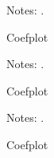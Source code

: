 \documentclass [11pt]{article}
\theoremstyle{plain}
\theoremstyle{definition}
\theoremstyle{remark}
\newcommand{\1}{\bm{1}}
\begin{document}
\begin{figure}[htbp]\centering
\caption{Coefplot}\label{Result1}
{\footnotesize  \begin{flushleft} Notes: .\end{flushleft}}
\end{figure}


\begin{figure}[htbp]\centering
\caption{Coefplot}\label{Result1}
{\footnotesize  \begin{flushleft} Notes: .\end{flushleft}}
\end{figure}

\begin{figure}[htbp]\centering
\caption{Coefplot}\label{Result1}
{\footnotesize  \begin{flushleft} Notes: .\end{flushleft}}
\end{figure}
\end{document}
